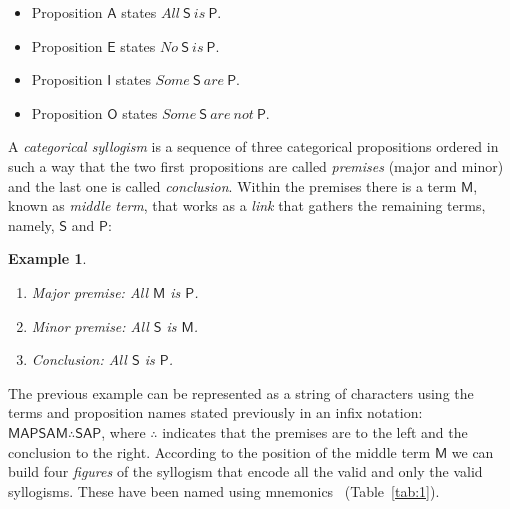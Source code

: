 \documentclass[a4paper,UKenglish]{lipics}
\newtheorem {myexample}{Example}
\begin{document}
\begin{itemize}
\item Proposition $\mathsf{A}$ states $All\ \mathsf{S}\ is\ \mathsf{P}$.
\item Proposition $\mathsf{E}$ states $No\ \mathsf{S}\ is\ \mathsf{P}$.
\item Proposition $\mathsf{I}$ states $Some\ \mathsf{S}\ are\ \mathsf{P}$.
\item Proposition $\mathsf{O}$ states $Some\ \mathsf{S}\ are\ not\ \mathsf{P}$.
\end{itemize}

A \textit{categorical syllogism} is a sequence of three categorical propositions ordered in such a way that the two first propositions are called \textit{premises} (major and minor) and the last one is called \textit{conclusion}. Within the premises there is a term $\mathsf{M}$, known as \textit{middle term}, that works as a \textit{link} that gathers the remaining terms, namely, $\mathsf{S}$ and $\mathsf{P}$:

\begin{myexample}\text{}
\begin{enumerate}
	\item Major premise: \textit{All} $\mathsf{M}$ \textit{is} $\mathsf{P}$.
	\item Minor premise: \textit{All} $\mathsf{S}$ \textit{is} $\mathsf{M}$.
	\item Conclusion: \textit{All} $\mathsf{S}$ \textit{is} $\mathsf{P}$.
\end{enumerate}
\end{myexample}


The previous example can be represented as a string of characters using the terms and proposition names stated previously in an infix notation: $\mathsf{MAP}\mathsf{SAM}\therefore\mathsf{SAP}$, where $\therefore$ indicates that the premises are to the left and the conclusion to the right. According to the position of the middle term $\mathsf{M}$ we can build four \textit{figures} of the syllogism that encode all the valid and only the valid syllogisms. These have been named using mnemonics~\cite{PETEROFSPAIN} (Table~\ref{tab:1}).
\end{document}
